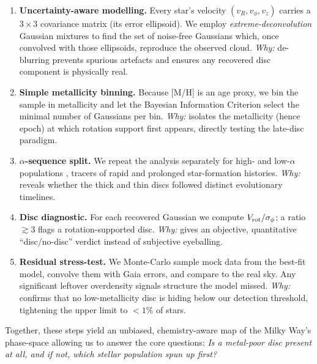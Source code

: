 \documentclass[a4paper,10pt]{article}
\begin{document}
\begin{multicols}{2}
\begin{enumerate}
  \item \textbf{Uncertainty-aware modelling.}  
        Every star's velocity $(v_R,v_\phi,v_z)$ carries a $3\times3$ covariance
        matrix (its error ellipsoid).  We employ \emph{extreme-deconvolution}
        Gaussian mixtures \cite{Bovy2011,pygmmis} to find the set of
        noise-free Gaussians which, once convolved with those ellipsoids,
        reproduce the observed cloud.  
        \textit{Why:} de-blurring prevents spurious artefacts and ensures any
        recovered disc component is physically real.

  \item \textbf{Simple metallicity binning.}  
        Because [M/H] is an age proxy, we bin the sample in metallicity and let
        the Bayesian Information Criterion select the minimal number of
        Gaussians per bin.  
        \textit{Why:} isolates the metallicity (hence epoch) at which
        rotation support first appears, directly testing the late-disc
        paradigm.

  \item \textbf{$\alpha$-sequence split.}  
        We repeat the analysis separately for high- and low-$\alpha$
        populations \cite{Vis2024}, tracers of rapid and prolonged
        star-formation histories.  
        \textit{Why:} reveals whether the thick and thin discs followed
        distinct evolutionary timelines.

  \item \textbf{Disc diagnostic.}  
        For each recovered Gaussian we compute $V_{\rm rot}/\sigma_\phi$; a
        ratio $\gtrsim3$ flags a rotation-supported disc.  
        \textit{Why:} gives an objective, quantitative “disc/no-disc” verdict
        instead of subjective eyeballing.

  \item \textbf{Residual stress-test.}  
        We Monte-Carlo sample mock data from the best-fit model, convolve them
        with Gaia errors, and compare to the real sky.  Any significant
        leftover overdensity signals structure the model missed.  
        \textit{Why:} confirms that no low-metallicity disc is hiding below our
        detection threshold, tightening the upper limit to \mbox{$<1\%$} of
        stars.
\end{enumerate}

Together, these steps yield an unbiased, chemistry-aware map of the Milky
Way's phase-space allowing us to answer the core questions:  
\emph{Is a metal-poor disc present at all, and if not, which stellar population
spun up first?}



\end{multicols}
\end{document}
